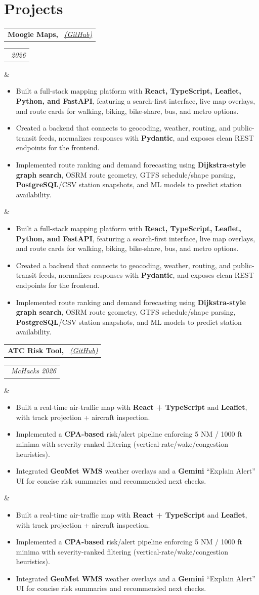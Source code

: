 \documentclass[10pt,a4paper,sans]{moderncv}
\makeatletter
\newcommand*{\customcventry}[7][.13em]{
\begin{tabular}{@{}l}
{\bfseries #4} \
{\itshape #3}
\end{tabular}
\hfill
\begin{tabular}{l@{}}
{\bfseries #5} \
{\itshape #2}
\end{tabular}
\ifx&#7&%
\else
{%
\begin{minipage}{\maincolumnwidth}%
\raggedright
#7%
\end{minipage}%
}%
\fi
\par\addvspace{#1}}
\makeatother
\begin{document}
\section{Projects}

\customcventry{2026}{{\color{blue}\href{}{(GitHub)}}}{Moogle Maps,}{}{}{
\renewcommand{\labelitemi}{\textbullet} %
\begin{itemize} \itemsep -2pt %
    \item Built a full-stack mapping platform with \textbf{React, TypeScript, Leaflet, Python, and FastAPI}, featuring a search-first interface, live map overlays, and route cards for walking, biking, bike-share, bus, and metro options.
    \item Created a backend that connects to geocoding, weather, routing, and public-transit feeds, normalizes responses with \textbf{Pydantic}, and exposes clean REST endpoints for the frontend.
    \item Implemented route ranking and demand forecasting using \textbf{Dijkstra-style graph search}, OSRM route geometry, GTFS schedule/shape parsing, \textbf{PostgreSQL}/CSV station snapshots, and ML models to predict station availability. \linebreak
\end{itemize}
}



\customcventry{McHacks 2026}{{\color{blue}\href{https://github.com/ericmapple/ATC-Risk-Tool-}{(GitHub)}}}{ATC Risk Tool,}{}{}{
\renewcommand{\labelitemi}{\textbullet}
\begin{itemize} \itemsep -2pt
  \item Built a real-time air-traffic map with \textbf{React + TypeScript} and \textbf{Leaflet}, with track projection + aircraft inspection.
  \item Implemented a \textbf{CPA-based} risk/alert pipeline enforcing 5 NM / 1000 ft minima with severity-ranked filtering (vertical-rate/wake/congestion heuristics).
  \item Integrated \textbf{GeoMet WMS} weather overlays and a \textbf{Gemini} “Explain Alert” UI for concise risk summaries and recommended next checks. \linebreak
\end{itemize}
}
\end{document}
